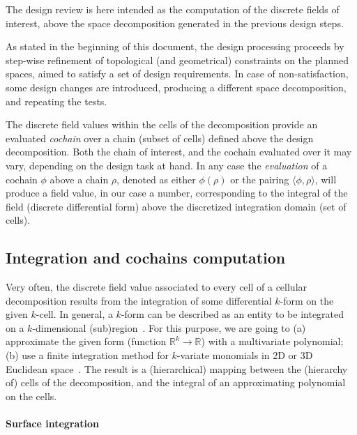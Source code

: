 \documentclass[11pt,oneside]{article}    %
\def\R{\mathbb{R}}
\begin{document}
The design review is here intended as the computation of the discrete fields of interest,
above the space decomposition generated in the previous design steps. 

As stated in the beginning of this document, the design processing proceeds by step-wise refinement 
of topological (and geometrical) constraints on the planned spaces, aimed to satisfy
a set of design requirements. In case of non-satisfaction, some design changes are introduced, producing a different space decomposition, and repeating the tests.

The discrete field values within the cells of the decomposition provide an evaluated \emph{cochain} over 
a chain (subset of cells) defined above the design decomposition. Both the chain of interest, and the cochain evaluated over it may vary, depending on the design task at hand. In any case the \emph{evaluation} of a cochain $\phi$ above a chain $\rho$, denoted as either $\phi(\rho)$ or the pairing $\langle \phi,\rho \rangle$, will produce a field value, in our case a number, corresponding to the integral of the field (discrete differential form) above the discretized integration domain (set of cells).

\subsection{Integration and cochains computation}

Very often, the discrete field value associated to every cell of a cellular decomposition  results from the integration  of some differential $k$-form on the given $k$-cell.  In general, a $k$-form can be described as an entity to be integrated on a $k$-dimensional (sub)region~\cite{Desbrun:2005:DDF:1198555.1198666}.
For this purpose, we are going to  (a)  approximate the given form (function $\R^k \to \R$) with a multivariate polynomial;
(b)    use a finite integration method for $k$-variate monomials in 2D or 3D Euclidean space~\cite{CattaniP-BIL1990}.
The result is a (hierarchical) mapping between the (hierarchy of) cells of the decomposition, and the integral of an approximating polynomial on the cells.

\paragraph{Surface integration}
\end{document}
